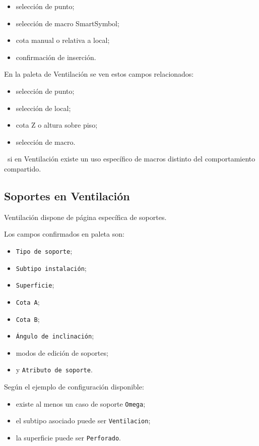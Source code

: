 \begin{itemize}
\item selección de punto;
\item selección de macro SmartSymbol;
\item cota manual o relativa a local;
\item confirmación de inserción.
\end{itemize}

En la paleta de Ventilación se ven estos campos relacionados:

\begin{itemize}
\item selección de punto;
\item selección de local;
\item cota Z o altura sobre piso;
\item selección de macro.
\end{itemize}

\pendingtag\ si en Ventilación existe un uso específico de macros distinto del comportamiento compartido.


\subsection{Soportes en Ventilación}

Ventilación dispone de página específica de soportes.

Los campos confirmados en paleta son:

\begin{itemize}
\item \texttt{Tipo de soporte};
\item \texttt{Subtipo instalación};
\item \texttt{Superficie};
\item \texttt{Cota A};
\item \texttt{Cota B};
\item \texttt{Ángulo de inclinación};
\item modos de edición de soportes;
\item y \texttt{Atributo de soporte}.
\end{itemize}

Según el ejemplo de configuración disponible:

\begin{itemize}
\item existe al menos un caso de soporte \texttt{Omega};
\item el subtipo asociado puede ser \texttt{Ventilacion};
\item la superficie puede ser \texttt{Perforado}.
\end{itemize}

